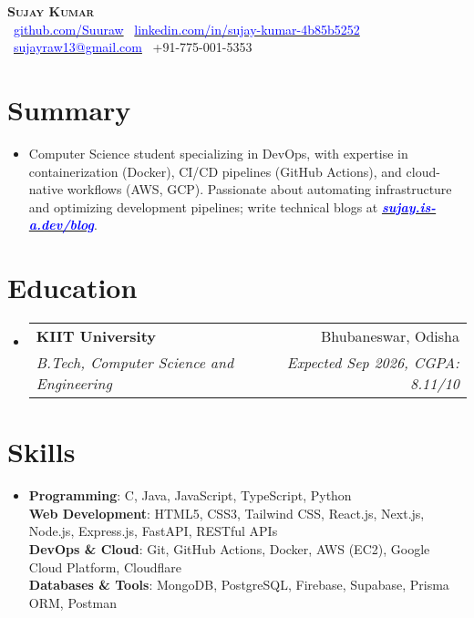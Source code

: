 \documentclass[letterpaper,11pt]{article}
\makeatletter
\newcommand{\resumeSubheading}[4]{
  \vspace{-3pt}\item
  \begin{tabular*}{0.98\textwidth}[t]{l@{\extracolsep{\fill}}r}
    \textbf{#1} & #2 \\
    \textit{\small#3} & \textit{\small #4} \\
  \end{tabular*}\vspace{-6pt}
}
\newcommand{\resumeSubHeadingListStart}{\begin{itemize}[leftmargin=0.1in, label={}]}
\newcommand{\resumeSubHeadingListEnd}{\end{itemize}\vspace{-6pt}}
\makeatother
\begin{document}
\begin{center}
  \textbf{\Huge \scshape Sujay Kumar} \\ \vspace{8pt}
  \small
  \vspace{2pt}
  \faGithub\ \href{https://github.com/Suuraw}{\textcolor{blue}{github.com/Suuraw}} \quad
  \faLinkedin\ \href{https://linkedin.com/in/sujay-kumar-4b85b5252}{\textcolor{blue}{linkedin.com/in/sujay-kumar-4b85b5252}} \quad
  \faEnvelope\ \href{mailto:sujayraw13@gmail.com}{\textcolor{blue}{sujayraw13@gmail.com}} \quad
  \faPhone\ +91-775-001-5353
\end{center}
\vspace{-8pt}

\section{Summary}
\vspace{2pt}
\resumeSubHeadingListStart
\item{Computer Science student specializing in DevOps, with expertise in containerization (Docker), CI/CD pipelines (GitHub Actions), and cloud-native workflows (AWS, GCP). Passionate about automating infrastructure and optimizing development pipelines; write technical blogs at \href{https://sujay.is-a.dev/blog}{\textcolor{blue}{\textbf{\textit{sujay.is-a.dev/blog}}}}.}
\resumeSubHeadingListEnd

\section{Education}
\vspace{2pt}
\resumeSubHeadingListStart
  \resumeSubheading{KIIT University}{Bhubaneswar, Odisha}{B.Tech, Computer Science and Engineering}{Expected Sep 2026, CGPA: 8.11/10}
\resumeSubHeadingListEnd

\section{Skills}
\vspace{2pt}
\resumeSubHeadingListStart
  \item{
    \textbf{Programming}: C, Java, JavaScript, TypeScript, Python \\ \vspace{1pt}
    \textbf{Web Development}: HTML5, CSS3, Tailwind CSS, React.js, Next.js, Node.js, Express.js, FastAPI, RESTful APIs \\ \vspace{1pt}
    \textbf{DevOps \& Cloud}: Git, GitHub Actions, Docker, AWS (EC2), Google Cloud Platform, Cloudflare \\ \vspace{1pt}
    \textbf{Databases \& Tools}: MongoDB, PostgreSQL, Firebase, Supabase, Prisma ORM, Postman
  }
\resumeSubHeadingListEnd
\end{document}

